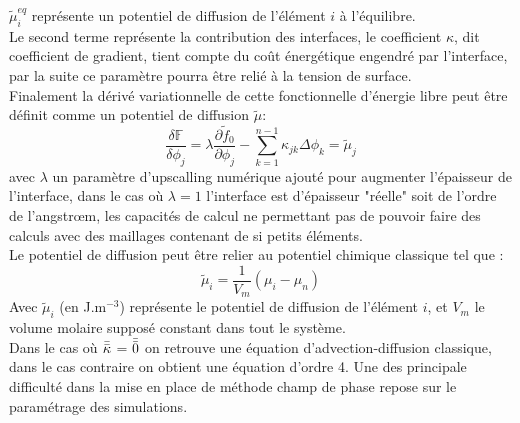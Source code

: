 $\tilde{\mu}_i^{eq}$ représente un potentiel de diffusion de l'élément $i$ à l'équilibre.\\
Le second terme représente la contribution des interfaces, le coefficient $\kappa$, dit coefficient de gradient, tient compte du coût énergétique engendré par l'interface, par la suite ce paramètre pourra être relié à la tension de surface. \\
Finalement la dérivé variationnelle de cette fonctionnelle d'énergie libre peut être définit comme un potentiel de diffusion $\tilde{\mu}$: 
\begin{equation}\label{eq_potentiel}
	\frac{\delta \mathbb{F}}{\delta \phi_j} =\lambda \frac{\partial \tilde{f}_0}{\partial \phi_j} -\sum_{k=1}^{n-1} \kappa_{jk} \Delta \phi_k = \tilde{\mu}_j
\end{equation}
avec $\lambda$ un paramètre d'upscalling numérique ajouté pour augmenter l'épaisseur de l'interface, dans le cas où $\lambda=1$ l'interface est d'épaisseur "réelle" soit de l'ordre de l'angstr\oe m, les capacités de calcul ne permettant pas de pouvoir faire des calculs avec des maillages contenant de si petits éléments. \\
Le potentiel de diffusion peut être relier au potentiel chimique classique tel que :
\begin{equation}
	\tilde{\mu}_i = \frac{1}{V_m}\left(\mu_i - \mu_n\right)
\end{equation}
Avec $\tilde{\mu}_i$ (en J.m$^{-3}$) représente le potentiel de diffusion de l'élément $i$, et $V_m$ le volume molaire supposé constant dans tout le système.\\
Dans le cas où $\bar{\bar{\kappa}}$ = $\bar{\bar{0}}$ on retrouve une équation d'advection-diffusion classique, dans le cas contraire on obtient une équation d'ordre 4. Une des principale difficulté dans la mise en place de méthode champ de phase repose sur le paramétrage des simulations.
